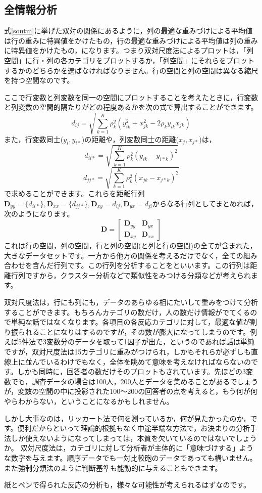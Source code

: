 \documentclass{ltjsbook}
\begin{document}
\subsection{全情報分析}
式\ref{soutui}に挙げた双対の関係にあるように，列の最適な重みづけによる平均値は行の重みに特異値をかけたもの，行の最適な重みづけによる平均値は列の重みに特異値をかけたもの，になります。つまり双対尺度法によるプロットは，「列空間」に行・列の各カテゴリをプロットするか，「列空間」にそれらをプロットするかのどちらかを選ばなければなりません。行の空間と列の空間は異なる縮尺を持つ空間なのです。

ここで行変数と列変数を同一の空間にプロットすることを考えたときに，行変数と列変数の空間的隔たりがどの程度あるかを次の式で算出することができます。
$$ d_{ij} = \sqrt{\sum_{k=1}^K \rho_k^2(y_{ik}^2+x_{jk}^2-2\rho_ky_{ik}x_{jk})} $$
また，行変数同士($y_i,y_{i*}$)の距離や，列変数同士の距離($x_j,x_{j*}$)は，
$$ d_{ii*} = \sqrt{\sum_{k=1}^K \rho_k^2(y_{ik}-y_{i*k})^2}$$
$$ d_{jj*} = \sqrt{\sum_{k=1}^K \rho_k^2(x_{jk}-x_{j*k})^2}$$
で求めることができます。これらを距離行列$\bm{D}_{yy} = \{ d_{ii*} \},\bm{D}_{xx} = \{ d_{jj*} \}, \bm{D}_{xy} = d_{ij}, \bm{D}_{yx} = d_{ji} $からなる行列としてまとめれば，次のようになります。
\begin{equation}
	\bm{D} =
	\begin{bmatrix}
		\bm{D}_{yy} & \bm{D}_{yx} \\
		\bm{D}_{xy} & \bm{D}_{xx}
	\end{bmatrix}
\end{equation}
これは行の空間，列の空間，行と列の空間(と列と行の空間)の全てが含まれた，大きなデータセットです。一方から他方の関係を考えるだけでなく，全ての組み合わせを含んだ行列です。この行列を分析することをといいます。この行列は距離行列ですから，クラスター分析などで類似性をみつける分類などが考えられます。


双対尺度法は，行にも列にも，データのあらゆる相にたいして重みをつけて分析することができます。もちろんカテゴリの数だけ，人の数だけ情報がでてくるので単純な話ではなくなります。各項目の各反応カテゴリに対して，最適な値が割り振られることになりはするのですが，その数が膨大になってしまうのです。例えば5件法で3変数分のデータを取って1因子が出た，というのであれば話は単純ですが，双対尺度法は15カテゴリに重みがつけられ，しかもそれらが必ずしも直線上に並んでいるわけでもなく，全体を眺めて意味を考えなければならないのです。しかも同時に，回答者の数だけそのプロットもされています。先ほどの3変数でも，調査データの場合は100人，200人とデータを集めることがあるでしょうが，変数の空間の中に投影された100〜200の回答者の点を考えると，もう何が何やらわからない，ということになるかもしれません。

しかし大事なのは，リッカート法で何を測っているか，何が見たかったのか，です。便利だからといって理論的根拠もなく中途半端な方法で，お決まりの分析手法しか使えないようになってしまっては，本質を欠いているのではないでしょうか。
双対尺度法は，カテゴリに対して分析者が主体的に「意味づけする」ような数字を与えます。順序データでも一対比較砲のデータであっても構いません。また強制分類法のように判断基準も能動的に与えることもできます。

紙とペンで得られた反応の分析も，様々な可能性が考えられるはずなのです。
\end{document}
